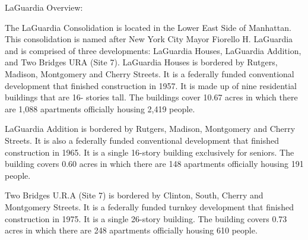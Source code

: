 LaGuardia Overview:   

 

The LaGuardia Consolidation is located in the Lower East Side of Manhattan. This consolidation is named after New York City Mayor Fiorello H. LaGuardia and is comprised of three developments: LaGuardia Houses, LaGuardia Addition, and Two Bridges URA (Site 7). LaGuardia Houses is bordered by Rutgers, Madison, Montgomery and Cherry Streets. It is a federally funded conventional development that finished construction in 1957. It is made up of nine residential buildings that are 16- stories tall. The buildings cover 10.67 acres in which there are 1,088 apartments officially housing 2,419 people.    

   

LaGuardia Addition is bordered by Rutgers, Madison, Montgomery and Cherry Streets. It is also a federally funded conventional development that finished construction in 1965. It is a single 16-story building exclusively for seniors. The building covers 0.60 acres in which there are 148 apartments officially housing 191 people.    

Two Bridges U.R.A (Site 7) is bordered by Clinton, South, Cherry and Montgomery Streets. It is a federally funded turnkey development that finished construction in 1975. It is a single 26-story building. The building covers 0.73 acres in which there are 248 apartments officially housing 610 people.    